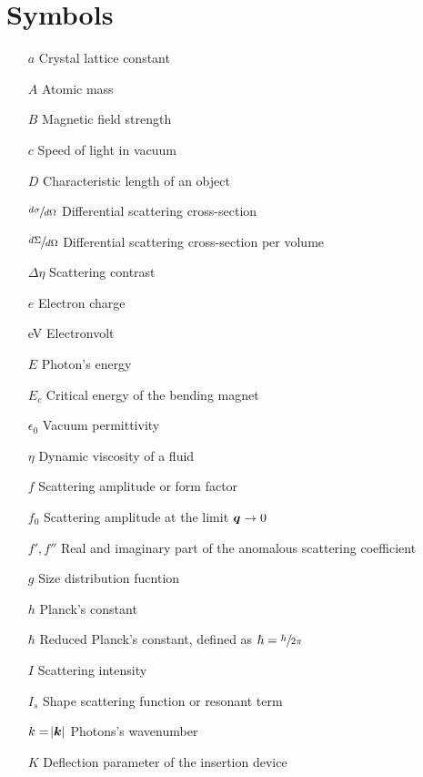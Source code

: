 \section*{Symbols}

\begin{itemize}
        \setlength\itemsep{1pt}
        
        \item[$a$] Crystal lattice constant
        \item[$A$] Atomic mass
        \item[$B$] Magnetic field strength
        \item[$c$] Speed of light in vacuum     
        \item[$D$] Characteristic length of an object
        \item[$\sfrac{d\sigma}{d\Omega}$] Differential scattering cross-section
        \item[$\sfrac{d\Sigma}{d\Omega}$] Differential scattering cross-section per volume
        \item[$\Delta\eta$] Scattering contrast        
        \item[$e$] Electron charge
        \item[eV] Electronvolt
        \item[$E$] Photon's energy
        \item[$E_c$] Critical energy of the bending magnet
        \item[$\epsilon_0$] Vacuum permittivity
        \item[$\eta$] Dynamic viscosity of a fluid 
        \item[$f$] Scattering amplitude or form factor
        \item[$f_0$] Scattering amplitude at the limit $\bm{q}\rightarrow 0$
        \item[$f',f''$] Real and imaginary part of the anomalous scattering coefficient
        \item[$g$] Size distribution fucntion
        \item[$h$] Planck's constant          
        \item[$\hbar$] Reduced Planck's constant, defined as $\hbar = \sfrac{h}{2 \pi}$
        \item[$I$] Scattering intensity
        \item[$I_s$] Shape scattering function or resonant term
        \item[$k=\abs{\bm{k}}$] Photons's wavenumber
        \item[$K$] Deflection parameter of the insertion device

\end{itemize}
